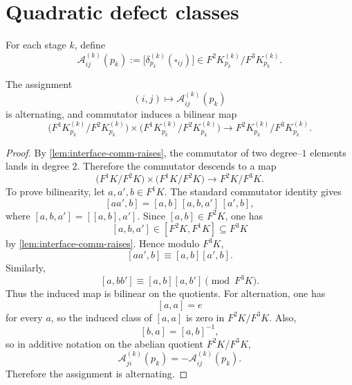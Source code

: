 \section{Quadratic defect classes}
\label{sec:interface-quadratic}
\begin{definition}
	For each stage \(k\), define
	\[
		\mathcal A_{ij}^{(k)}(p_k)
		:=
		\bigl[\delta_{p_k}^{(k)}(\square_{ij})\bigr]
		\in
		F^2K_{p_k}^{(k)}/F^3K_{p_k}^{(k)}.
	\]
\end{definition}
\begin{proposition}
	The assignment
	\[
		(i,j)\longmapsto \mathcal A_{ij}^{(k)}(p_k)
	\]
	is alternating, and commutator induces a bilinear map
	\[
		\bigl(F^1K_{p_k}^{(k)}/F^2K_{p_k}^{(k)}\bigr)
		\times
		\bigl(F^1K_{p_k}^{(k)}/F^2K_{p_k}^{(k)}\bigr)
		\longrightarrow
		F^2K_{p_k}^{(k)}/F^3K_{p_k}^{(k)}.
	\]
\end{proposition}
\begin{proof}
	By \cref{lem:interface-comm-raises}, the commutator of two degree--\(1\)
	elements lands in degree \(2\). Therefore the commutator descends to a
	map
	\[
		\bigl(F^1K/F^2K\bigr)\times\bigl(F^1K/F^2K\bigr)\to F^2K/F^3K.
	\]
	To prove bilinearity, let \(a,a',b\in F^1K\). The standard commutator
	identity gives
	\[
		[aa',b]=[a,b]\,[a,b,a']\,[a',b],
	\]
	where \([a,b,a']=[[a,b],a']\). Since \([a,b]\in F^2K\), one has
	\[
		[a,b,a']\in [F^2K,F^1K]\subseteq F^3K
	\]
	by \cref{lem:interface-comm-raises}. Hence modulo \(F^3K\),
	\[
		[aa',b]\equiv [a,b][a',b].
	\]
	Similarly,
	\[
		[a,bb']\equiv [a,b][a,b'] \pmod{F^3K}.
	\]
	Thus the induced map is bilinear on the quotients.
	For alternation, one has
	\[
		[a,a]=e
	\]
	for every \(a\), so the induced class of \([a,a]\) is zero in
	\(F^2K/F^3K\). Also,
	\[
		[b,a]=[a,b]^{-1},
	\]
	so in additive notation on the abelian quotient \(F^2K/F^3K\),
	\[
		\mathcal A_{ji}^{(k)}(p_k)=-\mathcal A_{ij}^{(k)}(p_k).
	\]
	Therefore the assignment is alternating.
\end{proof}

